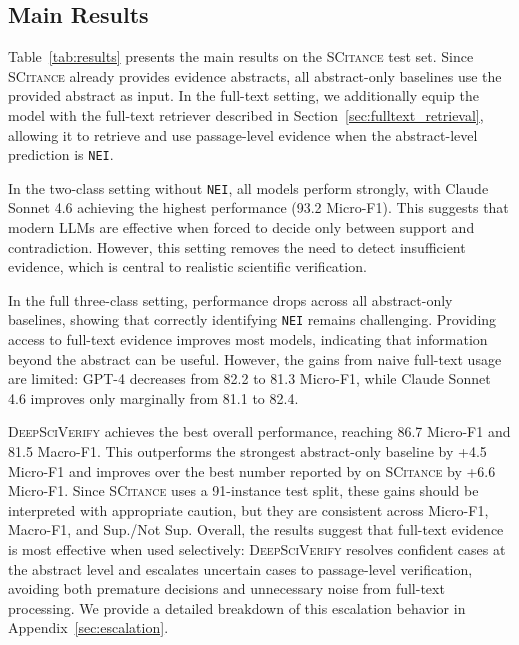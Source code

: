 \documentclass{article}
\theoremstyle{plain}
\theoremstyle{definition}
\theoremstyle{remark}
\begin{document}
\subsection{Main Results}
\label{sec:main_results}

Table~\ref{tab:results} presents the main results on the \textsc{SCitance} test set. Since \textsc{SCitance} already provides evidence abstracts, all abstract-only baselines use the provided abstract as input. In the full-text setting, we additionally equip the model with the full-text retriever described in Section~\ref{sec:fulltext_retrieval}, allowing it to retrieve and use passage-level evidence when the abstract-level prediction is \texttt{NEI}.

In the two-class setting without \texttt{NEI}, all models perform strongly, with Claude Sonnet 4.6 achieving the highest performance (93.2 Micro-F1). This suggests that modern LLMs are effective when forced to decide only between support and contradiction. However, this setting removes the need to detect insufficient evidence, which is central to realistic scientific verification.

In the full three-class setting, performance drops across all abstract-only baselines, showing that correctly identifying \texttt{NEI} remains challenging. Providing access to full-text evidence improves most models, indicating that information beyond the abstract can be useful. However, the gains from naive full-text usage are limited: GPT-4 decreases from 82.2 to 81.3 Micro-F1, while Claude Sonnet 4.6 improves only marginally from 81.1 to 82.4.

\textsc{DeepSciVerify} achieves the best overall performance, reaching 86.7 Micro-F1 and 81.5 Macro-F1. This outperforms the strongest abstract-only baseline by +4.5 Micro-F1 and improves over the best number reported by \citet{alvarez2024zero} on \textsc{SCitance} by +6.6 Micro-F1. Since \textsc{SCitance} uses a 91-instance test split, these gains should be interpreted with appropriate caution, but they are consistent across Micro-F1, Macro-F1, and Sup./Not Sup. Overall, the results suggest that full-text evidence is most effective when used selectively: \textsc{DeepSciVerify} resolves confident cases at the abstract level and escalates uncertain cases to passage-level verification, avoiding both premature decisions and unnecessary noise from full-text processing. We provide a detailed breakdown of this escalation behavior in Appendix~\ref{sec:escalation}.

\end{document}
